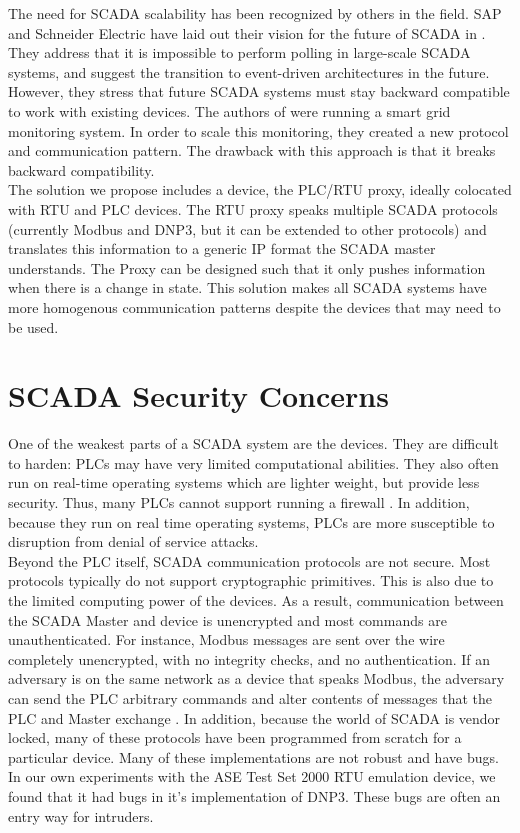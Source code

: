 \documentclass[oneside,11pt,a4paper,oldfontcommands]{book}
\begin{document}
\indent
The need for SCADA scalability has been recognized by others in the field.
SAP and Schneider Electric have laid out their vision for the future of SCADA in \cite{nextgen}. 
They address that it is impossible to perform polling in large-scale SCADA systems, and
suggest the transition to event-driven architectures in the future. However, they stress
that future SCADA systems must stay backward compatible to work with existing devices.
The authors of \cite{EventMeters} were running
a smart grid monitoring system. In order to scale this monitoring, they created a new 
protocol and communication pattern. The drawback with this approach
is that it breaks backward compatibility. \\

\indent
The solution we propose includes a device, the PLC/RTU proxy, ideally colocated with  RTU and PLC devices. The RTU
proxy speaks multiple SCADA protocols (currently Modbus and DNP3, but it can be extended
to other protocols) and translates
this information to a generic IP format the SCADA master understands. The Proxy
can be designed such that it only pushes information when there is a change in state.
This solution makes all SCADA systems have more homogenous communication patterns despite
the devices that may need to be used.


\section{SCADA Security Concerns}

\indent \indent 
One of the weakest parts of a SCADA system are the devices. They are difficult to harden:
PLCs may have very limited computational abilities. They also often run on
real-time operating systems which are lighter weight, but provide less security. Thus, many
PLCs cannot support running a firewall \cite{SCADANetworks}. In
addition, because they run on real time operating systems, PLCs are more susceptible
to disruption from denial of service attacks. \\

\indent
Beyond the PLC itself, SCADA communication protocols are not secure. 
Most protocols typically do not support cryptographic primitives.
This is also due to the limited computing power of the devices. As a result, 
communication between the SCADA Master and device is unencrypted and most
 commands are unauthenticated. For
instance, Modbus messages are 
sent over the wire completely unencrypted, with no integrity checks,
and no authentication. If an adversary is on the same network as a 
device that speaks Modbus,
the adversary can send the PLC arbitrary commands and alter contents of
messages that the PLC and Master exchange \cite{SecureModbus}. In addition, because the
world of SCADA is vendor locked, many of these protocols have been
programmed from scratch for a particular device. Many of these implementations
are not robust and have bugs. In our own experiments with the ASE Test Set 2000
RTU emulation device, we found that it had bugs in it's implementation of DNP3. These
bugs are often an entry way for intruders. \\
\end{document}
